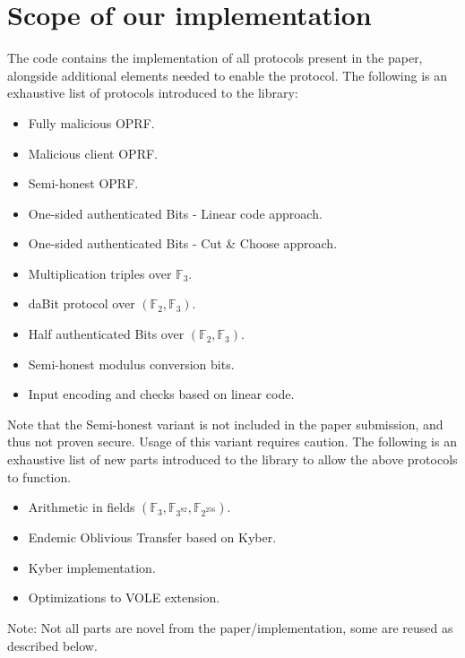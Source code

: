 \documentclass{article}
\newcommand{\F}{\mathbb{F}}
\begin{document}
\section{Scope of our implementation}
The code contains the implementation of all protocols present in the paper, alongside additional elements needed to enable the protocol. 
The following is an exhaustive list of protocols introduced to the library:
\begin{itemize}
    \item Fully malicious OPRF.
    \item Malicious client OPRF.
    \item Semi-honest OPRF.
    \item One-sided authenticated Bits - Linear code approach.
    \item One-sided authenticated Bits - Cut \& Choose approach.
    \item Multiplication triples over $\F_3$.
    \item daBit protocol over $(\F_2, \F_3)$.
    \item Half authenticated Bits over $(\F_2, \F_3)$.
    \item Semi-honest modulus conversion bits.
    \item Input encoding and checks based on linear code.
\end{itemize}
Note that the Semi-honest variant is not included in the paper submission, and thus not proven secure. Usage of this variant requires caution.
The following is an exhaustive list of new parts introduced to the library to allow the above protocols to function.
\begin{itemize}
    \item Arithmetic in fields $(\F_3, \F_{3^{82}}, \F_{2^{256}})$.
    \item Endemic Oblivious Transfer based on Kyber.
    \item Kyber implementation.
    \item Optimizations to VOLE extension.
\end{itemize}
Note: Not all parts are novel from the paper/implementation, some are reused as described below.
\end{document}
